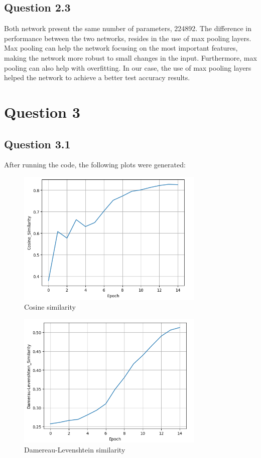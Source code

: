 \documentclass{article}
\begin{document}
\subsection{Question 2.3}
Both network present the same number of parameters, 224892.
The difference in performance between the two networks, resides in the use 
of max pooling layers. Max pooling can help the network focusing on the most
important features, making the network more robust to small changes in the
input. Furthermore, max pooling can also help with overfitting. In our case, 
the use of max pooling layers helped the network to achieve a better test 
accuracy results.

\section{Question 3}

\subsection{Question 3.1}
After running the code, the following plots were generated:

\begin{figure}[H]
    \centering
    \includegraphics[width=0.8\textwidth]{../report/plots/RNN-cosine-similarity.png}
    \caption{Cosine similarity}
    \label{fig:rnn-cosine-similarity}
\end{figure}

\begin{figure}[H]
    \centering
    \includegraphics[width=0.8\textwidth]{../report/plots/RNN-dl-similarity.png}
    \caption{Damereau-Levenshtein similarity}
    \label{fig:rnn-dl-similarity}
\end{figure}
\end{document}
